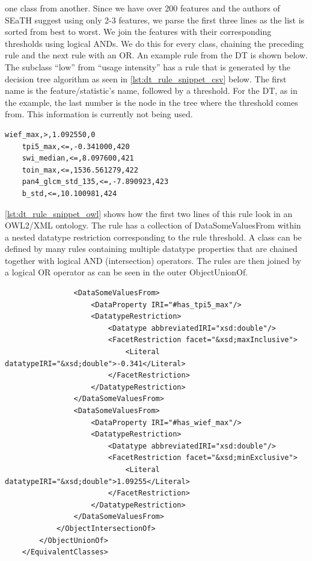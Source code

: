 \documentclass[authoryear, review,12pt,number]{elsarticle}
\begin{document}
one class from another. Since we have over 200 features and the authors of 
SEaTH suggest using only 2-3 features, we parse the first three lines as the 
list is sorted from best to worst. We join the features with their 
corresponding thresholds using logical ANDs. We do this for every class, 
chaining the preceding rule and the next rule with an OR. An example rule from 
the DT is shown below.
\\
The subclass ``low'' from ``usage intensity'' has a rule that is generated by
the decision tree algorithm as seen in \ref{lst:dt_rule_snippet_csv} below. 
The first name is the feature/statistic's name, followed by a threshold. For 
the DT, as in the example, the last number is the node in the tree where the 
threshold comes from. This information is currently not being used.
\label{lst:dt_rule_snippet_csv}
\begin{lstlisting}[frame=single]
    wief_max,>,1.092550,0
    tpi5_max,<=,-0.341000,420
    swi_median,<=,8.097600,421
    toin_max,<=,1536.561279,422
    pan4_glcm_std_135,<=,-7.890923,423
    b_std,<=,10.100981,424
\end{lstlisting}
\ref{lst:dt_rule_snippet_owl} shows how the first two 
lines of this rule look in an OWL2/XML ontology. The rule has a collection of 
DataSomeValuesFrom within a nested datatype restriction corresponding to the 
rule threshold. A class can be defined by many rules containing multiple 
datatype properties that are chained together with logical AND (intersection) 
operators. The rules are then joined by a logical OR operator as can be seen in 
the outer ObjectUnionOf.  
\label{lst:dt_rule_snippet_owl}
\begin{lstlisting}
                <DataSomeValuesFrom>
                    <DataProperty IRI="#has_tpi5_max"/>
                    <DatatypeRestriction>
                        <Datatype abbreviatedIRI="xsd:double"/>
                        <FacetRestriction facet="&xsd;maxInclusive">
                            <Literal datatypeIRI="&xsd;double">-0.341</Literal>
                        </FacetRestriction>
                    </DatatypeRestriction>
                </DataSomeValuesFrom>
                <DataSomeValuesFrom>
                    <DataProperty IRI="#has_wief_max"/>
                    <DatatypeRestriction>
                        <Datatype abbreviatedIRI="xsd:double"/>
                        <FacetRestriction facet="&xsd;minExclusive">
                            <Literal datatypeIRI="&xsd;double">1.09255</Literal>
                        </FacetRestriction>
                    </DatatypeRestriction>
                </DataSomeValuesFrom>
            </ObjectIntersectionOf>
        </ObjectUnionOf>
    </EquivalentClasses>
\end{lstlisting}
\end{document}
